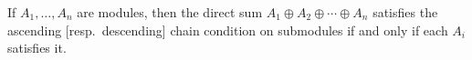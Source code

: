 If $A_1, \ldots, A_n$ are modules, then the direct sum $A_1 \oplus A_2 \oplus \cdots \oplus A_n$ satisfies the ascending [resp.\ descending] chain condition on submodules if and only if each $A_i$ satisfies it.
